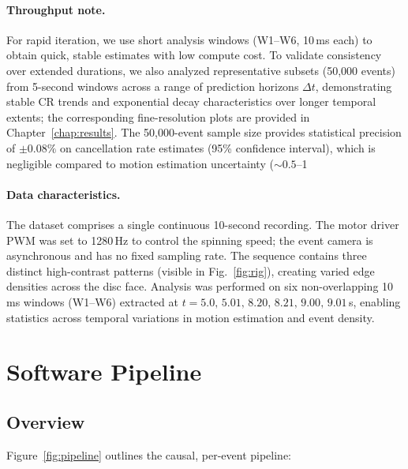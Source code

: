 \paragraph{Throughput note.}
For rapid iteration, we use short analysis windows (W1--W6, 10\,ms each) to obtain quick, stable estimates with low compute cost. To validate consistency over extended durations, we also analyzed representative subsets (50,000 events) from 5-second windows across a range of prediction horizons $\Delta t$, demonstrating stable CR trends and exponential decay characteristics over longer temporal extents; the corresponding fine-resolution plots are provided in Chapter~\ref{chap:results}. The 50,000-event sample size provides statistical precision of $\pm 0.08\%$ on cancellation rate estimates (95\% confidence interval), which is negligible compared to motion estimation uncertainty ($\sim 0.5$--1%

\paragraph{Data characteristics.}
The dataset comprises a single continuous 10-second recording. The motor driver PWM was set to 1280\,Hz to control the spinning speed; the event camera is asynchronous and has no fixed sampling rate. The sequence contains three distinct high-contrast patterns (visible in Fig.~\ref{fig:rig}), creating varied edge densities across the disc face. Analysis was performed on six non-overlapping 10\,ms windows (W1--W6) extracted at $t=5.0,\,5.01,\,8.20,\,8.21,\,9.00,\,9.01$\,s, enabling statistics across temporal variations in motion estimation and event density.

\section{Software Pipeline}
\label{sec:software}

\subsection{Overview}
Figure~\ref{fig:pipeline} outlines the causal, per-event pipeline:


